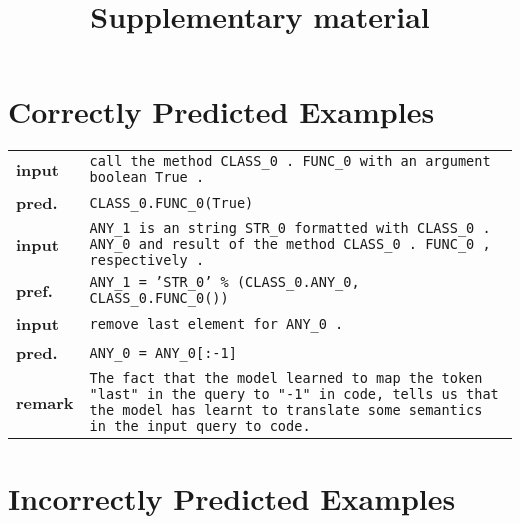 \documentclass{article}
\title{Supplementary material}
\author{}
\date{}
\begin{document}
  \maketitle

  \section{Correctly Predicted Examples}

  \begin{tabular}{ l p{}}
    \hline
		\textbf{input} & \texttt{call the method CLASS\_0 . FUNC\_0 with an argument boolean True .} \\
    \textbf{pred.} & \texttt{CLASS\_0.FUNC\_0(True)} \\
    \hline
		\textbf{input} & \texttt{ANY\_1 is an string STR\_0 formatted with CLASS\_0 . ANY\_0 and 
                      result of the method CLASS\_0 . FUNC\_0 , respectively .}	\\
		\textbf{pref.} & \texttt{ANY\_1 = 'STR\_0' \% (CLASS\_0.ANY\_0, CLASS\_0.FUNC\_0())} \\
    \hline
    \textbf{input} & \texttt{remove last element for ANY\_0 .} \\
    \textbf{pred.} & \texttt{ANY\_0 = ANY\_0[:-1]} \\
    \textbf{remark}& \texttt{The fact that the model learned to map the token "last" in the 
                     query to "-1" in code, tells us that the model has learnt to translate some 
                     semantics in the input query to code.} \\
    \hline
  \end{tabular}

  \section{Incorrectly Predicted Examples}
\end{document}

